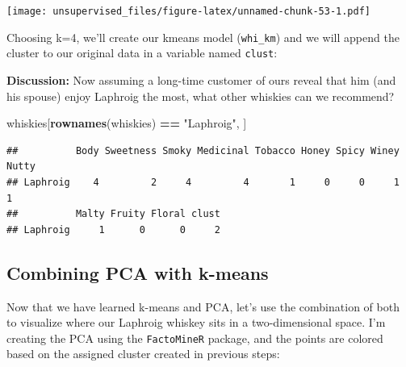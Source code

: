\documentclass[]{article}
\newenvironment{Shaded}{\begin{snugshade}}{\end{snugshade}}
\newcommand{\CommentTok}[1]{\textcolor[rgb]{0.56,0.35,0.01}{\textit{#1}}}
\newcommand{\DataTypeTok}[1]{\textcolor[rgb]{0.13,0.29,0.53}{#1}}
\newcommand{\DecValTok}[1]{\textcolor[rgb]{0.00,0.00,0.81}{#1}}
\newcommand{\KeywordTok}[1]{\textcolor[rgb]{0.13,0.29,0.53}{\textbf{#1}}}
\newcommand{\NormalTok}[1]{#1}
\newcommand{\OperatorTok}[1]{\textcolor[rgb]{0.81,0.36,0.00}{\textbf{#1}}}
\newcommand{\StringTok}[1]{\textcolor[rgb]{0.31,0.60,0.02}{#1}}
\begin{document}
\texttt{[image: unsupervised\_files/figure-latex/unnamed-chunk-53-1.pdf]}

Choosing k=4, we'll create our kmeans model (\texttt{whi\_km}) and we
will append the cluster to our original data in a variable named
\texttt{clust}:

\begin{Shaded}
\end{Shaded}

\textbf{Discussion:} Now assuming a long-time customer of ours reveal
that him (and his spouse) enjoy Laphroig the most, what other whiskies
can we recommend?

\begin{Shaded}
\begin{Highlighting}[]
\NormalTok{whiskies[}\KeywordTok{rownames}\NormalTok{(whiskies) }\OperatorTok{==}\StringTok{ "Laphroig"}\NormalTok{, ]}
\end{Highlighting}
\end{Shaded}

\begin{verbatim}
##          Body Sweetness Smoky Medicinal Tobacco Honey Spicy Winey Nutty
## Laphroig    4         2     4         4       1     0     0     1     1
##          Malty Fruity Floral clust
## Laphroig     1      0      0     2
\end{verbatim}

\hypertarget{combining-pca-with-k-means}{%
\subsection{Combining PCA with
k-means}\label{combining-pca-with-k-means}}

Now that we have learned k-means and PCA, let's use the combination of
both to visualize where our Laphroig whiskey sits in a two-dimensional
space. I'm creating the PCA using the \texttt{FactoMineR} package, and
the points are colored based on the assigned cluster created in previous
steps:

\begin{Shaded}
\end{Shaded}
\end{document}
